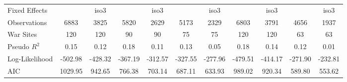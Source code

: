 \begin{tabular}{lcccccccccc}
Fixed Effects &  & iso3 &  & iso3 &  & iso3 &  & iso3 &  & iso3 \\
Observations & 6883 & 3825 & 5820 & 2629 & 5173 & 2329 & 6803 & 3791 & 4656 & 1937 \\
War Sites & 120 & 120 & 90 & 90 & 75 & 75 & 120 & 120 & 63 & 63 \\
Pseudo $R^2$ & 0.15 & 0.12 & 0.18 & 0.11 & 0.13 & 0.05 & 0.18 & 0.14 & 0.12 & 0.01 \\
Log-Likelihood & -502.98 & -428.32 & -367.19 & -312.57 & -327.55 & -277.96 & -479.51 & -414.17 & -271.90 & -232.81 \\
AIC & 1029.95 & 942.65 & 766.38 & 703.14 & 687.11 & 633.93 & 989.02 & 920.34 & 589.80 & 553.62 \\
\bottomrule
\end{tabular}

